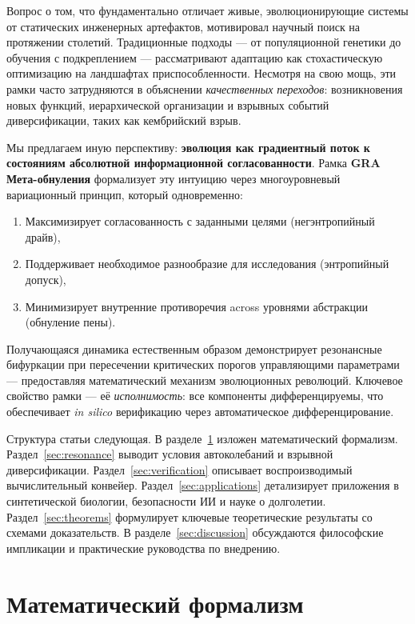 \documentclass[11pt,a4paper]{article}
\theoremstyle{plain}
\theoremstyle{definition}
\theoremstyle{remark}
\begin{document}
Вопрос о том, что фундаментально отличает живые, эволюционирующие системы от статических инженерных артефактов, мотивировал научный поиск на протяжении столетий. Традиционные подходы --- от популяционной генетики до обучения с подкреплением --- рассматривают адаптацию как стохастическую оптимизацию на ландшафтах приспособленности. Несмотря на свою мощь, эти рамки часто затрудняются в объяснении \textit{качественных переходов}: возникновения новых функций, иерархической организации и взрывных событий диверсификации, таких как кембрийский взрыв.

Мы предлагаем иную перспективу: \textbf{эволюция как градиентный поток к состояниям абсолютной информационной согласованности}. Рамка \textbf{GRA Мета-обнуления} формализует эту интуицию через многоуровневый вариационный принцип, который одновременно:
\begin{enumerate}[label=(\roman*)]
    \item Максимизирует согласованность с заданными целями (негэнтропийный драйв),
    \item Поддерживает необходимое разнообразие для исследования (энтропийный допуск),
    \item Минимизирует внутренние противоречия across уровнями абстракции (обнуление пены).
\end{enumerate}

Получающаяся динамика естественным образом демонстрирует резонансные бифуркации при пересечении критических порогов управляющими параметрами --- предоставляя математический механизм эволюционных революций. Ключевое свойство рамки --- её \textit{исполнимость}: все компоненты дифференцируемы, что обеспечивает \textit{in silico} верификацию через автоматическое дифференцирование.

Структура статьи следующая. В разделе~\ref{sec:formalism} изложен математический формализм. Раздел~\ref{sec:resonance} выводит условия автоколебаний и взрывной диверсификации. Раздел~\ref{sec:verification} описывает воспроизводимый вычислительный конвейер. Раздел~\ref{sec:applications} детализирует приложения в синтетической биологии, безопасности ИИ и науке о долголетии. Раздел~\ref{sec:theorems} формулирует ключевые теоретические результаты со схемами доказательств. В разделе~\ref{sec:discussion} обсуждаются философские импликации и практические руководства по внедрению.

\section{Математический формализм}
\label{sec:formalism}
\end{document}
